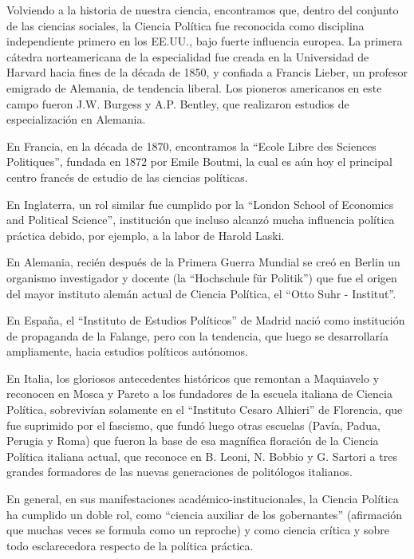\documentclass[
]{book}
\begin{document}
Volviendo a la historia de nuestra ciencia, encontramos que, dentro del conjunto de las ciencias sociales, la Ciencia Política fue reconocida como disciplina independiente primero en los EE.UU., bajo fuerte influencia europea. La primera cátedra norteamericana de la especialidad fue creada en la Universidad de Harvard hacia fines de la década de 1850, y confiada a Francis Lieber, un profesor emigrado de Alemania, de tendencia liberal. Los pioneros americanos en este campo fueron J.W. Burgess y A.P. Bentley, que realizaron estudios de especialización en Alemania.

En Francia, en la década de 1870, encontramos la ``Ecole Libre des Sciences Politiques'', fundada en 1872 por Emile Boutmi, la cual es aún hoy el principal centro francés de estudio de las ciencias políticas.

En Inglaterra, un rol similar fue cumplido por la ``London School of Economics and Political Science'', institución que incluso alcanzó mucha influencia política práctica debido, por ejemplo, a la labor de Harold Laski.

En Alemania, recién después de la Primera Guerra Mundial se creó en Berlin un organismo investigador y docente (la ``Hochschule für Politik'') que fue el origen del mayor instituto alemán actual de Ciencia Política, el ``Otto Suhr - Institut''.

En España, el ``Instituto de Estudios Políticos'' de Madrid nació como institución de propaganda de la Falange, pero con la tendencia, que luego se desarrollaría ampliamente, hacia estudios políticos autónomos.

En Italia, los gloriosos antecedentes históricos que remontan a Maquiavelo y reconocen en Mosca y Pareto a los fundadores de la escuela italiana de Ciencia Política, sobrevivían solamente en el ``Instituto Cesaro Alhieri'' de Florencia, que fue suprimido por el fascismo, que fundó luego otras escuelas (Pavía, Padua, Perugia y Roma) que fueron la base de esa magnífica floración de la Ciencia Política italiana actual, que reconoce en B. Leoni, N. Bobbio y G. Sartori a tres grandes formadores de las nuevas generaciones de politólogos italianos.

En general, en sus manifestaciones académico-institucionales, la Ciencia Política ha cumplido un doble rol, como ``ciencia auxiliar de los gobernantes'' (afirmación que muchas veces se formula como un reproche) y como ciencia crítica y sobre todo esclarecedora respecto de la política práctica.
\end{document}

